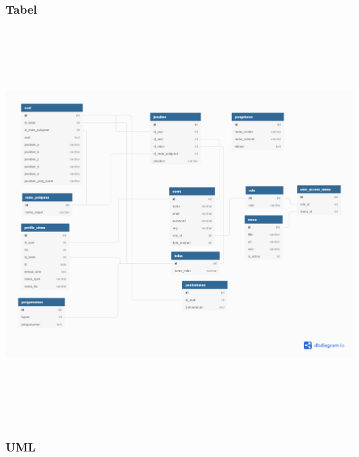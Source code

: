 \documentclass{scrreprt}
\begin{document}
		\subsubsection{Tabel}
			\centering
				\includegraphics[width=17cm, height=15cm]{database-wbt.png}
		
		
		\subsubsection{UML}
		
\end{document}
